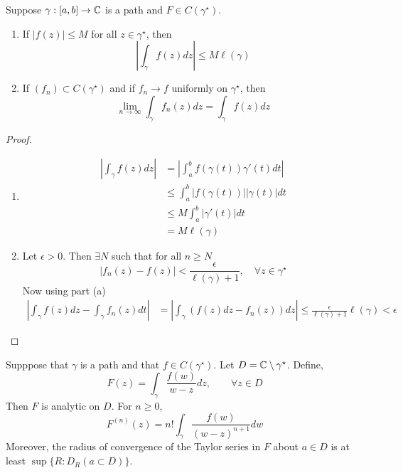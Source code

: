 \documentclass[12pt]{article}
\begin{document}
\begin{proposition}
    Suppose $\gamma:[a,b] \to \mathbb C$ is a path and $F \in C(\gamma^\star)$. 
    \begin{enumerate}
        \item [(a)] If $|f(z)| \leq M$ for all $z \in \gamma^\star$, then 
        \[\left| \int_\gamma f(z) dz\right| \leq M \ell(\gamma)\] 

        \item[(b)] If $(f_n) \subset C(\gamma^\star)$ and if $f_n \to f$ uniformly on $\gamma^\star$, then 
        \[\lim_{n\to \infty} \int_\gamma f_n(z) dz = \int_\gamma f(z) dz\]
    \end{enumerate}
\end{proposition}

\begin{proof}
    \begin{enumerate}
        \item [(a)] \begin{align*}
            \left| \int_\gamma f(z) dz \right| &= \left| \int_a^b f(\gamma(t)) \gamma'(t) dt\right| \\ 
            & \leq \int_a^b \left| f(\gamma(t))\right| |\gamma(t)| dt \\ 
            &\leq M \int_a^b |\gamma'(t)|dt \\ 
            &= M \ell(\gamma)
        \end{align*}

        \item[(b)] Let $\epsilon > 0$. Then $\exists N$ such that for all $n \geq N$ 
        \[|f_n(z)  - f(z)| < \frac{\epsilon}{\ell(\gamma) +1}, \quad \forall z \in \gamma^\star\]
        Now using part (a) 
        \begin{align*}
            \left|\int_\gamma f(z) dz - \int_\gamma f_n(z) dt\right| &= 
             \left|\int_\gamma (f(z) dz - f_n(z) )dz\right| \leq \frac{\epsilon}{\ell(\gamma ) + 1} \ell(\gamma) < \epsilon
        \end{align*}
    \end{enumerate}
\end{proof}

\begin{theorem}[3.31]
    Supppose that $\gamma$ is a path and that $f \in C(\gamma^\star)$. Let $D = \mathbb C \setminus \gamma^\star$. Define, 
    \[F(z) = \int_\gamma \frac{f(w)}{w-z} dz, \qquad \forall z \in D\]
    Then $F$ is analytic on $D$. For $n \geq 0$, 
    \[F^{(n)}(z) = n! \int_\gamma \frac{f(w)}{(w-z)^{n+1}} dw\]
    Moreover, the radius of convergence of the Taylor series in $F$ about $a \in D$ is at least $\sup \{R : D_R(a \subset D)\}$. 
\end{theorem}
\end{document}

